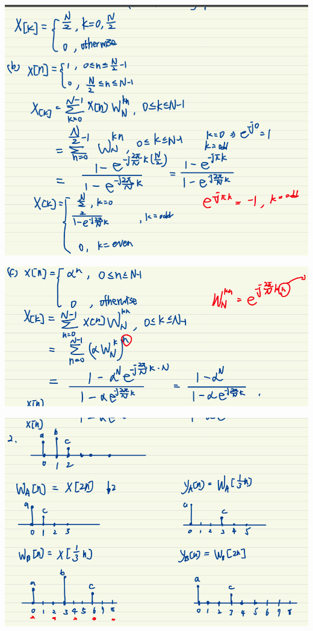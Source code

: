 \documentclass[a4paper]{article}
\begin{document}
	
	\begin{center}
		\includegraphics[width=1\linewidth]{screenshot077}
	\end{center}
	
	\begin{center}
		\includegraphics[width=1\linewidth]{screenshot078}
	\end{center}
	
	
	
	\begin{center}
		\includegraphics[width=1\linewidth]{screenshot079}
	\end{center}
	
\end{document}

